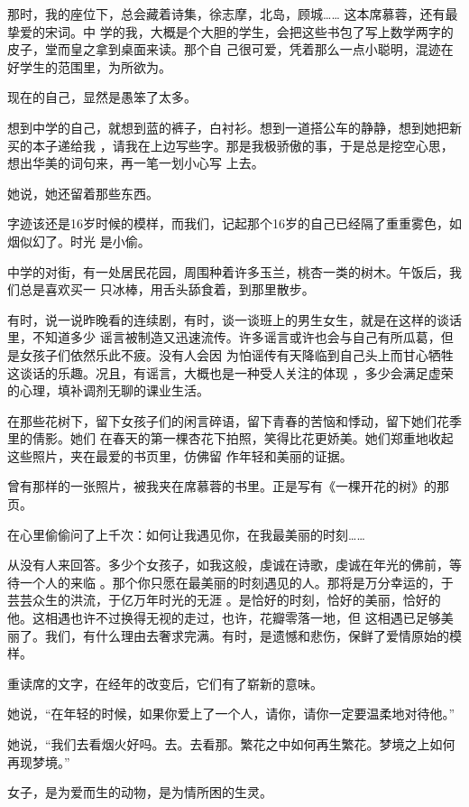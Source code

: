 \documentclass[12pt,a4paper]{article}
\begin{document}
		那时，我的座位下，总会藏着诗集，徐志摩，北岛，顾城…… 这本席慕蓉，还有最挚爱的宋词。中
	学的我，大概是个大胆的学生，会把这些书包了写上数学两字的皮子，堂而皇之拿到桌面来读。那个自
	己很可爱，凭着那么一点小聪明，混迹在好学生的范围里，为所欲为。

		现在的自己，显然是愚笨了太多。

		想到中学的自己，就想到蓝的裤子，白衬衫。想到一道搭公车的静静，想到她把新买的本子递给我
	，请我在上边写些字。那是我极骄傲的事，于是总是挖空心思，想出华美的词句来，再一笔一划小心写
	上去。

		她说，她还留着那些东西。

		字迹该还是16岁时候的模样，而我们，记起那个16岁的自己已经隔了重重雾色，如烟似幻了。时光
	是小偷。


		中学的对街，有一处居民花园，周围种着许多玉兰，桃杏一类的树木。午饭后，我们总是喜欢买一
	只冰棒，用舌头舔食着，到那里散步。

		有时，说一说昨晚看的连续剧，有时，谈一谈班上的男生女生，就是在这样的谈话里，不知道多少
	谣言被制造又迅速流传。许多谣言或许也会与自己有所瓜葛，但是女孩子们依然乐此不疲。没有人会因
	为怕谣传有天降临到自己头上而甘心牺牲这谈话的乐趣。况且，有谣言，大概也是一种受人关注的体现
	，多少会满足虚荣的心理，填补调剂无聊的课业生活。


		在那些花树下，留下女孩子们的闲言碎语，留下青春的苦恼和悸动，留下她们花季里的倩影。她们
	在春天的第一棵杏花下拍照，笑得比花更娇美。她们郑重地收起这些照片，夹在最爱的书页里，仿佛留
	作年轻和美丽的证据。

		曾有那样的一张照片，被我夹在席慕蓉的书里。正是写有《一棵开花的树》的那页。


		在心里偷偷问了上千次：如何让我遇见你，在我最美丽的时刻……

		从没有人来回答。多少个女孩子，如我这般，虔诚在诗歌，虔诚在年光的佛前，等待一个人的来临
	。那个你只愿在最美丽的时刻遇见的人。那将是万分幸运的，于芸芸众生的洪流，于亿万年时光的无涯
	。是恰好的时刻，恰好的美丽，恰好的他。这相遇也许不过换得无视的走过，也许，花瓣零落一地，但
	这相遇已足够美丽了。我们，有什么理由去奢求完满。有时，是遗憾和悲伤，保鲜了爱情原始的模样。


		重读席的文字，在经年的改变后，它们有了崭新的意味。

		她说，“在年轻的时候，如果你爱上了一个人，请你，请你一定要温柔地对待他。”

		她说，“我们去看烟火好吗。去。去看那。繁花之中如何再生繁花。梦境之上如何再现梦境。”

		女子，是为爱而生的动物，是为情所困的生灵。
\end{document}
